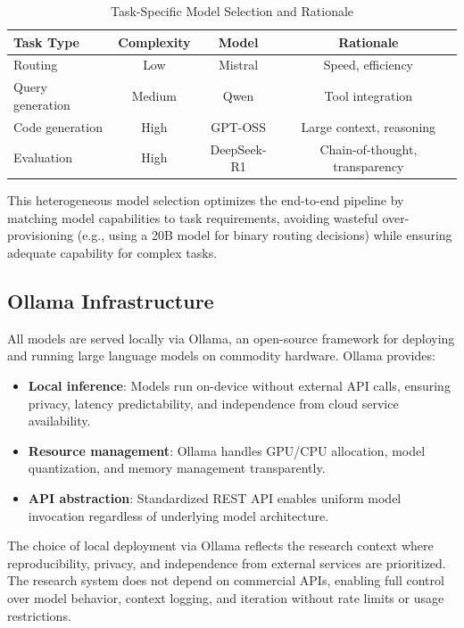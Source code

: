 \begin{table}[h]
\centering
\caption{Task-Specific Model Selection and Rationale}
\label{tab:model-selection}
\begin{tabular}{lccc}
\toprule
\textbf{Task Type} & \textbf{Complexity} & \textbf{Model} & \textbf{Rationale} \\
\midrule
Routing & Low & Mistral & Speed, efficiency \\
Query generation & Medium & Qwen & Tool integration \\
Code generation & High & GPT-OSS & Large context, reasoning \\
Evaluation & High & DeepSeek-R1 & Chain-of-thought, transparency \\
\bottomrule
\end{tabular}
\end{table}


This heterogeneous model selection optimizes the end-to-end pipeline by matching model capabilities to task requirements, avoiding wasteful over-provisioning (e.g., using a 20B model for binary routing decisions) while ensuring adequate capability for complex tasks.

\subsection{Ollama Infrastructure}

All models are served locally via Ollama, an open-source framework for deploying and running large language models on commodity hardware. Ollama provides:

\begin{itemize}
    \item \textbf{Local inference}: Models run on-device without external API calls, ensuring privacy, latency predictability, and independence from cloud service availability.
    
    \item \textbf{Resource management}: Ollama handles GPU/CPU allocation, model quantization, and memory management transparently.
    
    \item \textbf{API abstraction}: Standardized REST API enables uniform model invocation regardless of underlying model architecture.
\end{itemize}

The choice of local deployment via Ollama reflects the research context where reproducibility, privacy, and independence from external services are prioritized. The research system does not depend on commercial APIs, enabling full control over model behavior, context logging, and iteration without rate limits or usage restrictions.